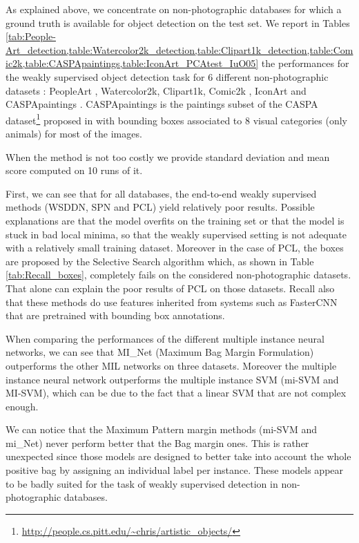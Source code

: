 \documentclass[preprint]{elsarticle}
\begin{document}
As explained above, we concentrate on non-photographic databases for which a ground truth is available for object detection on the test set. We report in Tables \cref{tab:People-Art_detection,table:Watercolor2k_detection,table:Clipart1k_detection,table:Comic2k,table:CASPApaintings,table:IconArt_PCAtest_IuO05}  the performances for the weakly supervised object detection task for 6 different non-photographic datasets : PeopleArt \cite{westlake_detecting_2016}, Watercolor2k, Clipart1k, Comic2k \cite{inoue_crossdomain_2018}, IconArt \cite{gonthier_weakly_2018} and CASPApaintings \cite{thomas_artistic_2018}.
CASPApaintings is the paintings subset of the CASPA dataset\footnote{\url{http://people.cs.pitt.edu/~chris/artistic_objects/}} proposed in \cite{thomas_artistic_2018} with bounding boxes associated to 8 visual categories (only animals) for most of the images. 

When the method is not too costly we provide standard deviation and mean score computed on 10 runs of it. 

First, we can see that for all databases, the end-to-end weakly  supervised methods (WSDDN, SPN and PCL) yield relatively poor results. Possible explanations are that the model overfits on the training set or that the model is stuck in bad local minima, so that the weakly supervised setting is not adequate with a relatively small training dataset.
Moreover in the case of PCL, the boxes are proposed by the Selective Search algorithm \cite{uijlings_selective_2013} which, as shown in Table \ref{tab:Recall_boxes}, completely fails on the considered non-photographic datasets. That alone can explain the poor results of PCL on those datasets. Recall also that these methods do use features inherited from systems such as FasterCNN that are pretrained with bounding box annotations.

When comparing the performances of the different multiple instance neural networks, we can see that MI\_Net (Maximum Bag Margin Formulation) outperforms the other MIL networks on three datasets. Moreover the multiple instance neural network outperforms the multiple instance SVM (mi-SVM and MI-SVM), which can be due to the fact that a linear SVM that are not complex enough. 

We can notice that the Maximum Pattern margin methods (mi-SVM and mi\_Net) never perform better that the Bag margin ones. This is rather unexpected since those models are designed to better take into account the whole positive bag by assigning an individual label per instance. These models appear to be badly suited for the task of weakly supervised detection in non-photographic databases.
\end{document}
